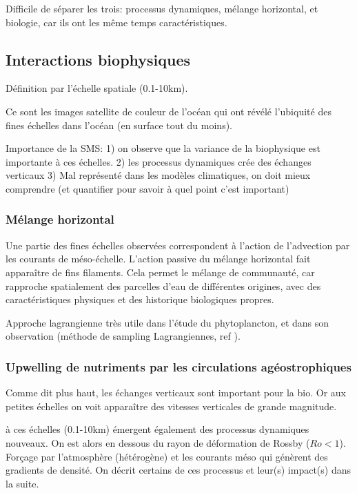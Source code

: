 Difficile de séparer les trois: processus dynamiques, mélange horizontal, et biologie, car ils ont les même temps caractéristiques.

\subsection{Interactions biophysiques}
\label{sec:interactions-biophys}

Définition par l'échelle spatiale (0.1-10km).

Ce sont les images satellite de couleur de l'océan qui ont révélé l'ubiquité des fines échelles dans l'océan (en surface tout du moins).

Importance de la SMS:
1) on observe que la variance de la biophysique est importante à ces échelles.
2) les processus dynamiques crée des échanges verticaux
3) Mal représenté dans les modèles climatiques, on doit mieux comprendre (et quantifier pour savoir à quel point c'est important)


\subsubsection{Mélange horizontal}
\label{sec:melange-horizontal}

Une partie des fines échelles observées correspondent à l'action de l'advection par les courants de méso-échelle. L'action passive du mélange horizontal fait apparaître de fins filaments.
Cela permet le mélange de communauté, car rapproche spatialement des parcelles d'eau de différentes origines, avec des caractéristiques physiques et des historique biologiques propres.

Approche lagrangienne très utile dans l'étude du phytoplancton, et dans son observation (méthode de sampling Lagrangiennes, ref ).


\subsubsection{Upwelling de nutriments par les circulations agéostrophiques}
\label{sec:upwelling-nutriments}

Comme dit plus haut, les échanges verticaux sont important pour la bio.
Or aux petites échelles on voit apparaître des vitesses verticales de grande magnitude.

à ces échelles (0.1-10km) émergent également des processus dynamiques nouveaux.
On est alors en dessous du rayon de déformation de Rossby (\(Ro < 1\)).
Forçage par l'atmosphère (hétérogène) et les courants méso qui génèrent des gradients de densité.
On décrit certains de ces processus et leur(s) impact(s) dans la suite.

